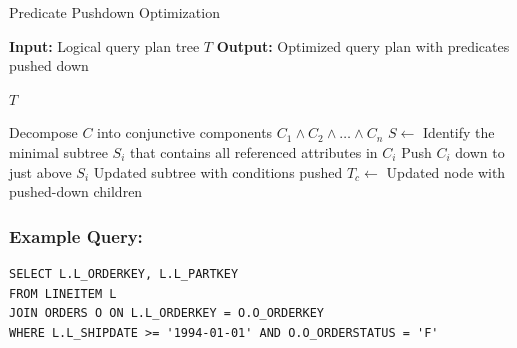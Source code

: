 \documentclass[12pt]{article}
\begin{document}
\begin{algorithm}[H]
\caption{Predicate Pushdown Optimization}
\begin{algorithmic}
  \State \textbf{Input:} Logical query plan tree $T$
  \State \textbf{Output:} Optimized query plan with predicates pushed down

      \State \Return $T$
    \EndIf

      \State Decompose $C$ into conjunctive components $C_1 \land C_2 \land \dots \land C_n$
      \State $S \gets$ 
        \State Identify the minimal subtree $S_i$ that contains all referenced attributes in $C_i$
        \State Push $C_i$ down to just above $S_i$
      \EndFor
      \State \Return Updated subtree with conditions pushed
    \Else
        \State $T_c \gets$ 
      \EndFor
      \State \Return Updated node with pushed-down children
    \EndIf
  \EndFunction
\end{algorithmic}
\end{algorithm}



\subsubsection*{Example Query:}

\begin{verbatim}
SELECT L.L_ORDERKEY, L.L_PARTKEY
FROM LINEITEM L
JOIN ORDERS O ON L.L_ORDERKEY = O.O_ORDERKEY
WHERE L.L_SHIPDATE >= '1994-01-01' AND O.O_ORDERSTATUS = 'F'
\end{verbatim}
\end{document}
